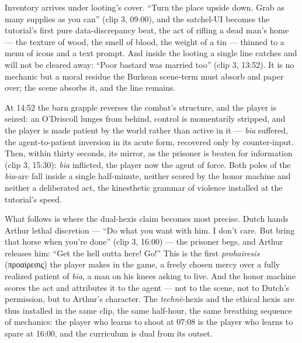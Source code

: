 \documentclass{article}
\newcommand{\gk}[1]{{\greekfont #1}}
\begin{document}
Inventory arrives under looting's cover. ``Turn the place upside down. Grab as many supplies as you can'' (clip 3, 09:00), and the satchel-UI becomes the tutorial's first pure data-discrepancy beat, the act of rifling a dead man's home — the texture of wood, the smell of blood, the weight of a tin — thinned to a menu of icons and a text prompt. And inside the looting a single line catches and will not be cleared away: ``Poor bastard was married too'' (clip 3, 13:52). It is no mechanic but a moral residue the Burkean scene-term must absorb and paper over; the scene absorbs it, and the line remains.

At 14:52 the barn grapple reverses the combat's structure, and the player is seized: an O'Driscoll lunges from behind, control is momentarily stripped, and the player is made patient by the world rather than active in it — \textit{bia} suffered, the agent-to-patient inversion in its acute form, recovered only by counter-input. Then, within thirty seconds, its mirror, as the prisoner is beaten for information (clip 3, 15:30): \textit{bia} inflicted, the player now the agent of force. Both poles of the \textit{bia}-arc fall inside a single half-minute, neither scored by the honor machine and neither a deliberated act, the kinesthetic grammar of violence installed at the tutorial's speed.

What follows is where the dual-hexis claim becomes most precise. Dutch hands Arthur lethal discretion — ``Do what you want with him. I don't care. But bring that horse when you're done'' (clip 3, 16:00) — the prisoner begs, and Arthur releases him: ``Get the hell outta here! Go!'' This is the first \textit{prohairesis} (\gk{προαίρεσις}) the player makes in the game, a freely chosen mercy over a fully realized patient of \textit{bia}, a man on his knees asking to live. And the honor machine scores the act and attributes it to the agent — not to the scene, not to Dutch's permission, but to Arthur's character. The \textit{technē}-hexis and the ethical hexis are thus installed in the same clip, the same half-hour, the same breathing sequence of mechanics: the player who learns to shoot at 07:08 is the player who learns to spare at 16:00, and the curriculum is dual from its outset.
\end{document}
